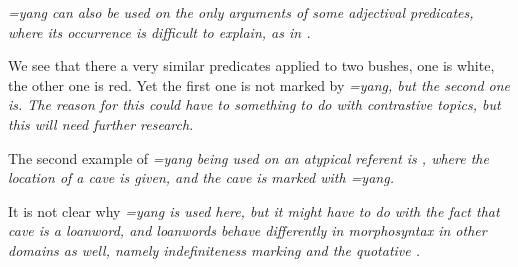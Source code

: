 \em =yang \em can also be used on the only arguments of some adjectival predicates, where its occurrence is difficult to explain, as in .


We see that there a very similar predicates applied to two bushes, one is white, the other one is red. Yet the first one is not marked by \em=yang, \em but the second one is. The reason for this could have to something to do with contrastive topics, but this will need further research.

The second example of \em =yang \em being used on an atypical referent is , where the location of a cave is given, and the cave is marked with \em =yang\em.




It is not clear why \em =yang \em is used here, but it might have to do with the fact that \em cave \em is a loanword, and loanwords behave differently in morphosyntax in other domains as well, namely indefiniteness marking  and the quotative .





% 
 

